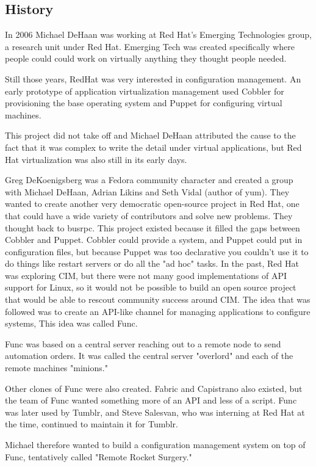\documentclass[12pt,a4paper,openright,twoside]{book}
\begin{document}
\subsection{History}
In 2006 Michael DeHaan was working at Red Hat's Emerging Technologies group, a research unit under Red Hat. Emerging Tech was created specifically where people could could work on virtually anything they thought people needed.


Still those years, RedHat was very interested in configuration management. An early prototype of application virtualization management used Cobbler for provisioning the base operating system and Puppet for configuring virtual machines.


This project did not take off and Michael DeHaan attributed the cause to the fact that it was complex to write the detail under virtual applications, but Red Hat virtualization was also still in its early days.


Greg DeKoenigsberg was a Fedora community character and created a group with Michael DeHaan, Adrian Likins and Seth Vidal (author of yum). They wanted to create another very democratic open-source project in Red Hat, one that could have a wide variety of contributors and solve new problems. They thought back to busrpc. This project existed because it filled the gaps between Cobbler and Puppet. Cobbler could provide a system, and Puppet could put in configuration files, but because Puppet was too declarative you couldn't use it to do things like restart servers or do all the "ad hoc" tasks. In the past, Red Hat was exploring CIM, but there were not many good implementations of API support for Linux, so it would not be possible to build an open source project that would be able to rescout community success around CIM. The idea that was followed was to create an API-like channel for managing applications to configure systems, This idea was called Func.


Func was based on a central server reaching out to a remote node to send automation orders. It was called the central server "overlord" and each of the remote machines "minions." 


Other clones of Func were also created. Fabric and Capistrano also existed, but the team of Func wanted something more of an API and less of a script. Func was later used by Tumblr, and Steve Salesvan, who was interning at Red Hat at the time, continued to maintain it for Tumblr.


Michael therefore wanted to build a configuration management system on top of Func, tentatively called "Remote Rocket Surgery."
\end{document}
